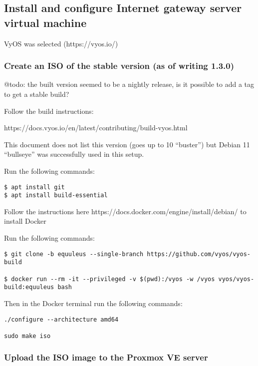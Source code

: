 \documentclass[
	11pt, %
	fleqn, %
	a4paper, %
]{LegrandOrangeBook}
\begin{document}
\hypertarget{install-and-configure-internet-gateway-server-virtual-machine}{%
\subsection{Install and configure Internet gateway server virtual
machine}\label{install-and-configure-internet-gateway-server-virtual-machine}}

VyOS was selected (https://vyos.io/)

\hypertarget{create-an-iso-of-the-stable-version-as-of-writing-1.3.0}{%
\subsubsection{Create an ISO of the stable version (as of writing
1.3.0)}\label{create-an-iso-of-the-stable-version-as-of-writing-1.3.0}}

@todo: the built version seemed to be a nightly release, is it possible
to add a tag to get a stable build?

Follow the build instructions:

https://docs.vyos.io/en/latest/contributing/build-vyos.html

This document does not list this version (goes up to 10 ``buster'') but
Debian 11 ``bullseye'' was successfully used in this setup.

Run the following commands:

\begin{verbatim}
$ apt install git
$ apt install build-essential
\end{verbatim}

Follow the instructions here
https://docs.docker.com/engine/install/debian/ to install Docker

Run the following commands:

\begin{verbatim}
$ git clone -b equuleus --single-branch https://github.com/vyos/vyos-build

$ docker run --rm -it --privileged -v $(pwd):/vyos -w /vyos vyos/vyos-build:equuleus bash
\end{verbatim}

Then in the Docker terminal run the following commands:

\begin{verbatim}
./configure --architecture amd64

sudo make iso
\end{verbatim}

\hypertarget{upload-the-iso-image-to-the-proxmox-ve-server}{%
\subsubsection{Upload the ISO image to the Proxmox VE
server}\label{upload-the-iso-image-to-the-proxmox-ve-server}}
\end{document}
